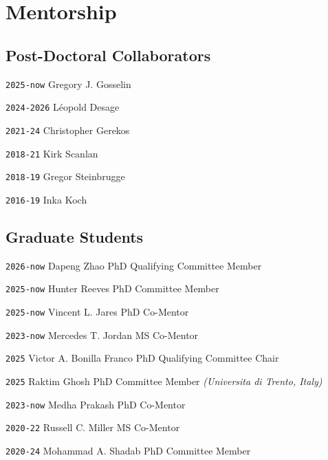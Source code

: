 \section*{Mentorship}

\TabPositions{6em,17em,26em}

\subsection*{Post-Doctoral Collaborators}

\noindent \texttt{2025-now} \tab Gregory J. Gosselin 

\noindent \texttt{2024-2026} \tab Léopold Desage 

\noindent \texttt{2021-24} \tab Christopher Gerekos %

\noindent \texttt{2018-21} \tab Kirk Scanlan %

\noindent \texttt{2018-19} \tab Gregor Steinbrugge %

\noindent \texttt{2016-19} \tab Inka Koch %

\vspace{-1em}
\subsection*{Graduate Students}
\TabPositions{6em,17em,28em}

\noindent \texttt{2026-now} \tab Dapeng Zhao \tab PhD Qualifying Committee Member

\noindent \texttt{2025-now} \tab Hunter Reeves \tab PhD Committee Member

\noindent \texttt{2025-now} \tab Vincent L. Jares \tab PhD Co-Mentor

\noindent \texttt{2023-now} \tab Mercedes T. Jordan \tab MS Co-Mentor

\noindent \texttt{2025} \tab Victor A. Bonilla Franco \tab PhD Qualifying  Committee Chair

\noindent \texttt{2025} \tab Raktim Ghosh \tab PhD Committee Member \textit{(Universita di Trento, Italy)}

\noindent \texttt{2023-now} \tab Medha Prakash \tab PhD Co-Mentor

\noindent \texttt{2020-22} \tab Russell C. Miller \tab MS Co-Mentor

\noindent \texttt{2020-24} \tab Mohammad A. Shadab \tab PhD Committee Member

